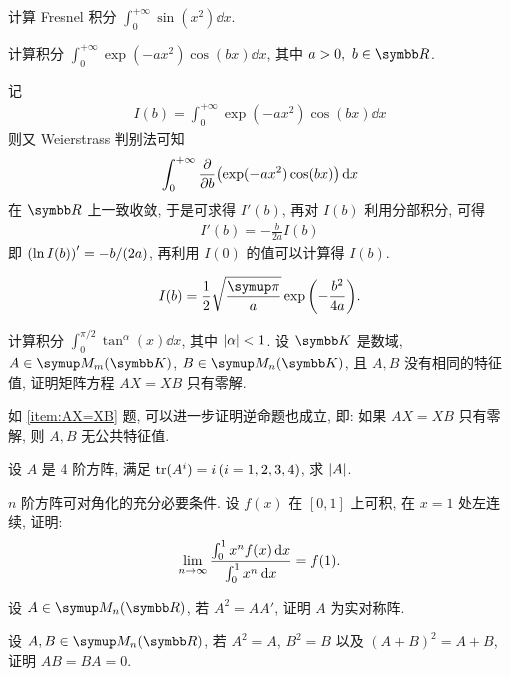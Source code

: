 \documentclass{ctexart}
\begin{document}
\begin{exercise}[series=exer]
\begin{hint}
    \end{hint}
    \hitem 计算 Fresnel 积分 $ \int_{0}^{+\infty} \sin(x^{2}) \dd{x} $.
    \item 计算积分 $ \int_{0}^{+\infty} \exp(-a x^{2})\cos(bx) \dd{x} $, 其中 $ a > 0,\ b\in \R $.
    \begin{hint}
        记
        \begin{align*}
            I(b) = \int_{0}^{+\infty} \exp(-a x^{2})\cos(bx) \dd{x}
        \end{align*}
        则又 Weierstrass 判别法可知
        \begin{align*}
            \int_{0}^{+\infty} \pdv{b}\qty(\exp(-a x^{2})\cos(bx)) \dd{x}
        \end{align*}
        在 $ \R $ 上一致收敛, 于是可求得 $ I'(b) $, 再对 $ I(b) $ 利用分部积分, 可得
        \begin{align*}
            I'(b) = -\frac{b}{2a}I(b)
        \end{align*}
        即 $ \qty(\ln I(b))' = -b/(2a) $, 再利用 $ I(0) $ 的值可以计算得 $ I(b) $. 
    \end{hint}
    \begin{answer}
        \begin{align*}
            I(b) = \frac{1}{2}\sqrt{\frac{\pi}{a}}\exp\qty(-\frac{b^{2}}{4a}).
        \end{align*}
    \end{answer}
    \item 计算积分 $ \int_{0}^{\pi/2} \tan^{\alpha}(x) \dd{x} $, 其中 $ \abs{\alpha} < 1 $. 
    \sitem\label{item:AX=XB} 设 $ \K $ 是数域, $ A \in \MM[\K][m] $, $ B \in \MM[\K][n] $, 且 $ A, B $ 没有相同的特征值, 证明矩阵方程 $ AX = XB $ 只有零解.
    \item 如 \ref{item:AX=XB} 题, 可以进一步证明逆命题也成立, 即: 如果 $ AX = XB $ 只有零解, 则 $ A, B $ 无公共特征值.
    \item 设 $ A $ 是 4 阶方阵, 满足 $ \tr(A^{i}) = i\,(i = 1, 2, 3, 4) $, 求 $ \abs{A} $. 
    \item $ n $ 阶方阵可对角化的充分必要条件.
    \hitem 设 $ f(x) $ 在 $ [0, 1] $ 上可积, 在 $ x = 1 $ 处左连续, 证明:
    \begin{align*}
        \lim_{n \to \infty}\frac{\int_{0}^{1} x^{n} f(x) \dd{x}}{\int_{0}^{1} x^{n} \dd{x}} = f(1).
    \end{align*}
    \item 设 $ A \in \MM $, 若 $ A^{2} = AA' $, 证明 $ A $ 为实对称阵.
    \item 设 $ A, B \in \MM $, 若 $ A^{2} = A $, $ B^{2} = B $ 以及 $ (A + B)^{2} = A + B $, 证明 $ AB = BA = 0 $.  

\end{exercise}
\end{document}
